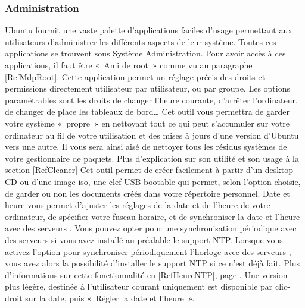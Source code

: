 \subsubsection{Administration}
Ubuntu fournit une vaste palette d'applications faciles d'usage permettant aux utilisateurs d'administrer les différents aspects de leur système. Toutes ces applications se trouvent sous Système \FlecheDroite Administration. Pour avoir accès à ces applications, il faut être «~Ami de root~» comme vu au paragraphe \ref{RefMdpRoot}.
Cette application permet un réglage précis des droits et permissions directement utilisateur par utilisateur, ou par groupe. Les options paramétrables sont les droits de changer l'heure courante, d'arrêter l'ordinateur, de changer de place les tableaux de bord\ldots{}
Cet outil vous permettra de garder votre système «~propre~» en nettoyant tout ce qui peut s'accumuler sur votre ordinateur au fil de votre utilisation et des mises à jours d'une version d'Ubuntu vers une autre. Il vous sera ainsi aisé de nettoyer tous les résidus systèmes de votre gestionnaire de paquets. Plus d'explication sur son utilité et son usage à la section \ref{RefCleaner} 
Cet outil permet de créer facilement à partir d'un desktop CD ou d'une image iso, une clef USB bootable qui permet, selon l'option choisie, de garder ou non les documents créés dans votre répertoire personnel.
Date et heure vous permet d'ajuster les réglages de la date et de l'heure de votre ordinateur, de spécifier votre fuseau horaire, et de synchroniser la date et l'heure avec des serveurs . Vous pouvez opter pour une synchronisation périodique avec des serveurs  si vous avez installé au préalable le support NTP. Lorsque vous activez l'option pour synchroniser périodiquement l'horloge avec des serveurs , vous avez alors la possibilité d'installer le support NTP si ce n'est déjà fait. Plus d'informations sur cette fonctionnalité en \ref{RefHeureNTP}, page \pageref{RefHeureNTP}. Une version plus légère, destinée à l'utilisateur courant uniquement est disponible par clic-droit sur la date, puis «~Régler la date et l'heure~».
